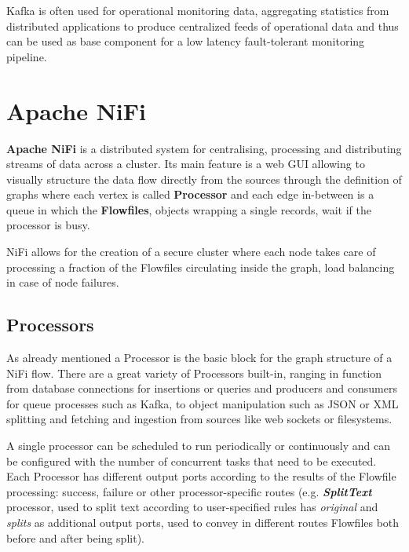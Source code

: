Kafka is often used for operational monitoring data, aggregating statistics from distributed applications to produce centralized feeds of operational data and thus can be used as base component for a low latency fault-tolerant monitoring pipeline.


\section{Apache NiFi}

\textbf{Apache NiFi} is a distributed system for centralising, processing and distributing streams of data across a cluster. Its main feature is a web GUI allowing to visually structure the data flow directly from the sources through the definition of graphs where each vertex is called \textbf{Processor} and each edge in-between is a queue in which the \textbf{Flowfiles}, objects wrapping a single records, wait if the processor is busy.

NiFi allows for the creation of a secure cluster where each node takes care of processing a fraction of the Flowfiles circulating inside the graph, load balancing in case of node failures. 

\subsection{Processors}

As already mentioned a Processor is the basic block for the graph structure of a NiFi flow. There are a great variety of Processors built-in, ranging in function from database connections for insertions or queries and producers and consumers for queue processes such as Kafka, to object manipulation such as JSON or XML splitting and fetching and ingestion from sources like web sockets or filesystems.

A single processor can be scheduled to run periodically or continuously and can be configured with the number of concurrent tasks that need to be executed. Each Processor has different output ports according to the results of the Flowfile processing: success, failure or other processor-specific routes (e.g. \textit{\textbf{SplitText}} processor, used to split text according to user-specified rules has \textit{original} and \textit{splits} as additional output ports, used to convey in different routes Flowfiles both before and after being split).